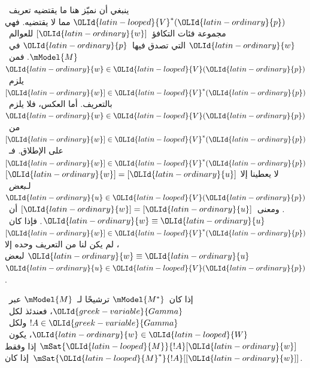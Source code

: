 \documentclass[../../../include/open-logic-section]{subfiles}
\begin{document}
ينبغي أن نميّز هنا ما يقتضيه تعريف~$\OLId{latin-looped}{V}^*(\OLId{latin-ordinary}{p})$
مما لا يقتضيه. فهي مجموعة فئات التكافؤ~$[\OLId{latin-ordinary}{w}]$
للعوالم~$\OLId{latin-ordinary}{w}$ التي تصدق فيها~$\OLId{latin-ordinary}{p}$ في~$\mModel{M}$.
فمن~$\OLId{latin-ordinary}{w} \in \OLId{latin-looped}{V}(\OLId{latin-ordinary}{p})$ يلزم~$[\OLId{latin-ordinary}{w}] \in \OLId{latin-looped}{V}^*(\OLId{latin-ordinary}{p})$
بالتعريف. أما العكس، فلا يلزم~$\OLId{latin-ordinary}{w} \in \OLId{latin-looped}{V}(\OLId{latin-ordinary}{p})$
من~$[\OLId{latin-ordinary}{w}] \in \OLId{latin-looped}{V}^*(\OLId{latin-ordinary}{p})$ على الإطلاق.
فـ~$[\OLId{latin-ordinary}{w}] \in \OLId{latin-looped}{V}^*(\OLId{latin-ordinary}{p})$ لا يعطينا إلا
$[\OLId{latin-ordinary}{w}]=[\OLId{latin-ordinary}{u}]$ لـ\emph{بعض}~$\OLId{latin-ordinary}{u} \in \OLId{latin-looped}{V}(\OLId{latin-ordinary}{p})$.
ومعنى~$[\OLId{latin-ordinary}{w}]=[\OLId{latin-ordinary}{u}]$ أن~$\OLId{latin-ordinary}{w} \equiv \OLId{latin-ordinary}{u}$.
فإذا كان~$[\OLId{latin-ordinary}{w}] \in \OLId{latin-looped}{V}^*(\OLId{latin-ordinary}{p})$، لم يكن لنا من
التعريف وحده إلا $\OLId{latin-ordinary}{w} \equiv \OLId{latin-ordinary}{u}$ لبعض~$\OLId{latin-ordinary}{u} \in \OLId{latin-looped}{V}(\OLId{latin-ordinary}{p})$.

\begin{thm}
  إذا كان~$\mModel{M^*}$ ترشيحًا لـ~$\mModel{M}$ عبر~$\OLId{greek-variable}{Gamma}$، فعندئذ
  لكل~$!A \in \OLId{greek-variable}{Gamma}$ ولكل~$\OLId{latin-ordinary}{w} \in \OLId{latin-looped}{W}$، يكون~$\mSat{\OLId{latin-looped}{M}}{!A}[\OLId{latin-ordinary}{w}]$ إذا
  وفقط إذا كان~$\mSat{\OLId{latin-looped}{M}^*}{!A}[{[\OLId{latin-ordinary}{w}]}]$.
\end{thm}
\end{document}
